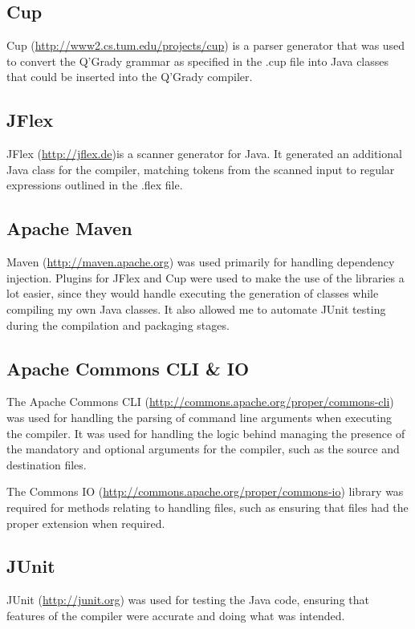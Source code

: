 \documentclass[report.tex]{subfiles}
\begin{document}
\subsection{Cup} %
\label{sub:cup}
Cup (\url{http://www2.cs.tum.edu/projects/cup}) is a parser generator that was
used to convert the Q'Grady grammar as specified in the .cup file into Java
classes that could be inserted into the Q'Grady compiler.

\subsection{JFlex} %
\label{sub:jflex}
JFlex (\url{http://jflex.de})is a scanner generator for Java. It generated an
additional Java class for the compiler, matching tokens from the scanned input
to regular expressions outlined in the .flex file.

\subsection{Apache Maven} %
\label{sub:apache_maven}
Maven (\url{http://maven.apache.org}) was used primarily for handling dependency
injection. Plugins for JFlex and Cup were used to make the use of the libraries
a lot easier, since they would handle executing the generation of classes while
compiling my own Java classes. It also allowed me to automate JUnit testing
during the compilation and packaging stages.

\subsection{Apache Commons CLI \& IO} %
\label{sub:apache_commons_cli}
The Apache Commons CLI (\url{http://commons.apache.org/proper/commons-cli}) was
used for handling the parsing of command line arguments when executing the
compiler. It was used for handling the logic behind managing the presence of
the mandatory and optional arguments for the compiler, such as the source and
destination files.

The Commons IO (\url{http://commons.apache.org/proper/commons-io}) library was
required for methods relating to handling files, such as ensuring that files
had the proper extension when required.

\subsection{JUnit} %
\label{sub:junit}
JUnit (\url{http://junit.org}) was used for testing the Java code, ensuring that
features of the compiler were accurate and doing what was intended.
\end{document}
